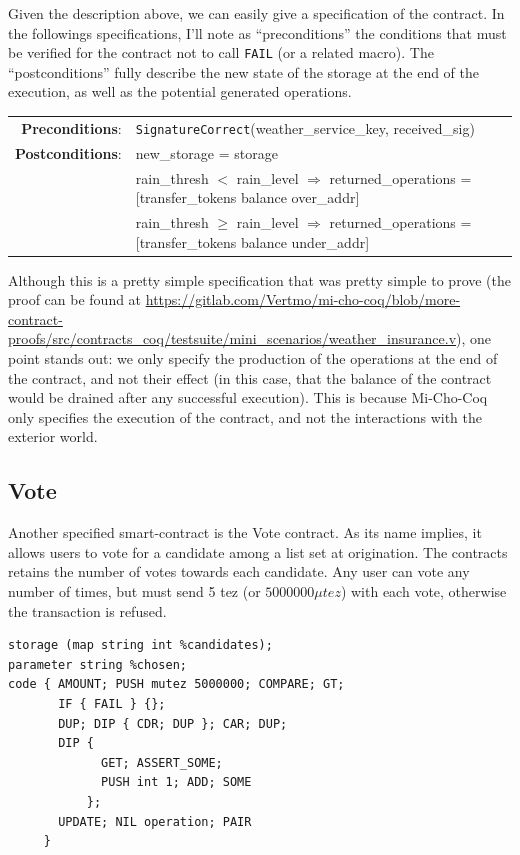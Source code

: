 \documentclass{report}
\begin{document}
Given the description above, we can easily give a specification of the contract. In the followings specifications, I'll note as ``preconditions'' the conditions that must be verified for the contract not to call \lstinline{FAIL} (or a related macro). The ``postconditions'' fully describe the new state of the storage at the end of the execution, as well as the potential generated operations.

{\small
\begin{longtable}{rl}
  \textbf{Preconditions}: & \texttt{SignatureCorrect}(weather\_service\_key, received\_sig)\\
  \textbf{Postconditions}: & new\_storage = storage\\
  & rain\_thresh $<$ rain\_level $\Rightarrow$ returned\_operations = [transfer\_tokens balance over\_addr]\\
  & rain\_thresh $\ge$ rain\_level $\Rightarrow$ returned\_operations = [transfer\_tokens balance under\_addr]\\
\end{longtable}}

Although this is a pretty simple specification that was pretty simple to prove (the proof can be found at \url{https://gitlab.com/Vertmo/mi-cho-coq/blob/more-contract-proofs/src/contracts_coq/testsuite/mini_scenarios/weather_insurance.v}), one point stands out: we only specify the production of the operations at the end of the contract, and not their effect (in this case, that the balance of the contract would be drained after any successful execution). This is because Mi-Cho-Coq only specifies the execution of the contract, and not the interactions with the exterior world.

\subsection{Vote}

Another specified smart-contract is the Vote contract. As its name implies, it allows users to vote for a candidate among a list set at origination. The contracts retains the number of votes towards each candidate. Any user can vote any number of times, but must send 5 tez (or $5000000\mu tez$) with each vote, otherwise the transaction is refused.

\begin{lstlisting}[language=michelson]
storage (map string int %candidates);
parameter string %chosen;
code { AMOUNT; PUSH mutez 5000000; COMPARE; GT;
       IF { FAIL } {};
       DUP; DIP { CDR; DUP }; CAR; DUP;
       DIP {
             GET; ASSERT_SOME;
             PUSH int 1; ADD; SOME
           };
       UPDATE; NIL operation; PAIR
     }
\end{lstlisting}
\end{document}
